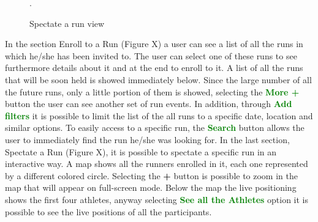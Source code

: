 \begin{enumerate}
\begin{figure}[H]
\begin{center}
\begin{minipage}[c]{.40\textwidth}
	\caption{Spectate a run view}.
        \end{minipage}
      \end{center}
\end{figure}
In the section Enroll to a Run (Figure X) a user can see a list of all the runs in which he/she has been invited to. The user can select one of these runs to see furthermore details about it and at the end to enroll to it. A list of all the runs that will be soon held is showed immediately below. Since the large number of all the future runs, only a little portion of them is showed, selecting the {\textcolor{Green}{\textbf{More +}}} button the user can see another set of run events. In addition, through {\textcolor{Green}{\textbf{Add filters}}} it is possible to limit the list of the all runs to a specific date, location and similar options. To easily access to a specific run, the {\textcolor{Green}{\textbf{Search}}} button allows the user to immediately find the run he/she was looking for. In the last section, Spectate a Run (Figure X), it is possible to spectate a specific run in an interactive way. A map shows all the runners enrolled in it, each one represented by a different colored circle. Selecting the \textbf{+} button is possible to zoom in the map that will appear on full-screen mode. Below the map the live positioning shows the first four athletes, anyway selecting {\textcolor{Green}{\textbf{See all the Athletes}}} option it is possible to see the live positions of all the participants.
\clearpage
\end{enumerate}